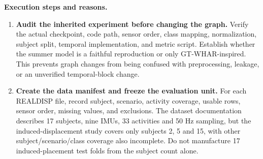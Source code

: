 \documentclass[10pt,a4paper]{article}
\begin{document}
\textbf{Execution steps and reasons.}
\begin{enumerate}
\item \textbf{Audit the inherited experiment before changing the graph.} Verify the actual checkpoint, code path, sensor order, class mapping, normalization, subject split, temporal implementation, and metric script. Establish whether the summer model is a faithful reproduction or only GT-WHAR-inspired. This prevents graph changes from being confused with preprocessing, leakage, or an unverified temporal-block change.
\item \textbf{Create the data manifest and freeze the evaluation unit.} For each REALDISP file, record subject, scenario, activity coverage, usable rows, sensor order, missing values, and exclusions. The dataset documentation describes 17 subjects, nine IMUs, 33 activities and 50 Hz sampling, but the induced-displacement study covers only subjects 2, 5 and 15, with other subject/scenario/class coverage also incomplete. Do not manufacture 17 induced-placement test folds from the subject count alone.


\end{enumerate}
\end{document}
